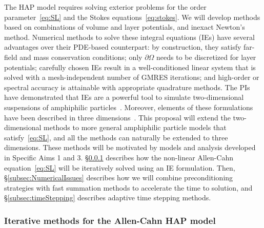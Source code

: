The HAP model requires solving exterior problems for the order
parameter~\eqref{eq:SL} and the Stokes equations~\eqref{eq:stokes}. We
will develop methods based on combinations of volume and layer
potentials, and inexact Newton's method. Numerical methods to solve
these integral equations (IEs) have several advantages over their
PDE-based counterpart: by construction, they satisfy far-field and mass
conservation conditions; only $\partial\Omega$ needs to be discretized
for layer potentials; carefully chosen IEs result in a well-conditioned
linear system that is solved with a mesh-independent number of GMRES
iterations; and high-order or spectral accuracy is attainable with
appropriate quadrature methods. The PIs have demonstrated that IEs are a
powerful tool to simulate two-dimensional suspensions of amphiphilic
particles~\cite{Fu2018_SIAM, FuQuRyYo20}. Moreover, elements of these
formulations have been described in three dimensions~\cite{ying_2006,
manasthesis, rac-gre2016}. This proposal will extend the two-dimensional
methods to more general amphiphilic particle models that
satisfy~\eqref{eq:SL}, and all the methods can naturally be extended to
three dimensions. These methods will be motivated by models and analysis
developed in Specific Aims 1 and 3. \S\ref{subsec:AC} describes how the
non-linear Allen-Cahn equation~\eqref{eq:SL} will be iteratively solved
using an IE formulation. Then, \S\ref{subsec:NumericalIssues} describes
how we will combine preconditioning strategies with fast summation
methods to accelerate the time to solution, and
\S\ref{subsec:timeStepping} describes adaptive time stepping methods.

\subsubsection{Iterative methods for the Allen-Cahn HAP model}
\label{subsec:AC}

